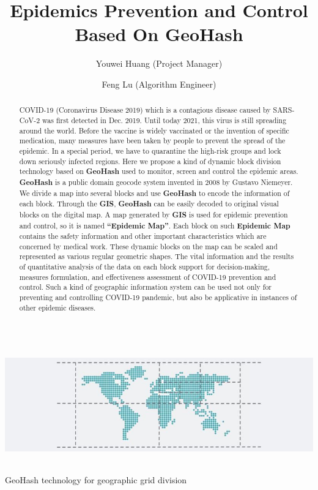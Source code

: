 \documentclass[sigplan,screen]{acmart}
\begin{document}
\title{Epidemics Prevention and Control Based On GeoHash}
\author{Youwei Huang (Project Manager)}
\author{Feng Lu (Algorithm Engineer)}
\begin{abstract}
	COVID-19 (Coronavirus Disease 2019) which is a contagious disease caused by SARS-CoV-2\cite{hu2020characteristics} was first detected in Dec. 2019.
	Until today 2021, this virus is still spreading around the world.
	Before the vaccine is widely vaccinated or the invention of specific medication, many measures have been taken by people to prevent the spread of the epidemic.
	In a special period, we have to quarantine the high-risk groups and lock down seriously infected regions.
	Here we propose a kind of dynamic block division technology based on \textbf{GeoHash} used to monitor, screen and control the epidemic areas.
	\textbf{GeoHash} is a public domain geocode system invented in 2008 by Gustavo Niemeyer\cite{niemeyer2008geohash}.
	We divide a map into several blocks and use \textbf{GeoHash} to encode the information of each block.
	Through the \textbf{GIS}, \textbf{GeoHash} can be easily decoded to original visual blocks on the digital map.
	A map generated by \textbf{GIS} is used for epidemic prevention and control, so it is named \textbf{``Epidemic Map''}.
	Each block on such \textbf{Epidemic Map} contains the safety information and other important characteristics which are concerned by medical work.
	These dynamic blocks on the map can be scaled and represented as various regular geometric shapes.
	The vital information and the results of quantitative analysis of the data on each block support for decision-making, measures formulation, and effectiveness assessment of COVID-19 prevention and control.
	Such a kind of geographic information system can be used not only for preventing and controlling COVID-19 pandemic, but also be applicative in instances of other epidemic diseases.
\end{abstract}
\begin{teaserfigure}
	\centering\includegraphics[height=50mm]{logo.png}
	\caption{GeoHash technology for geographic grid division}
	\label{fig:teaser}
\end{teaserfigure}
\end{document}
